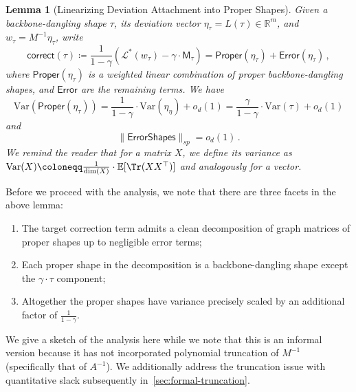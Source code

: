 \documentclass[12pt]{article}
\def \R {\mathbb{R}}
\def \E {\mathbb{E}}
\newcommand{\Var}{\mathrm{Var}}
\newtheorem{lemma}[theorem]{Lemma}
\newcommand{\gam}{\gamma}
\newcommand{\cm}{\mathsf{M} }
\newcommand{\corr}{\mathsf{correct}}
\begin{document}
%
% 
 
 \begin{lemma}[Linearizing Deviation Attachment into Proper Shapes]  \label{lem:vertical-concatenation}
 Given a backbone-dangling shape $\tau$, its deviation vector $\eta_\tau = L(\tau) \in \R^m $, and $w_\tau = M^{-1} \eta_\tau$, write \[ 
\corr(\tau) \coloneqq \frac{1}{1-\gamma} \left( \mathcal{L}^*(w_\tau ) - \gam \cdot \cm_\tau  \right)=   \mathsf{Proper}(\eta_\tau) + \mathsf{Error}(\eta_\tau)\,,
 \]
 where $\mathsf{Proper}(\eta_\tau)$ is a weighted linear combination of proper backbone-dangling shapes,	
 and $\mathsf{Error}$ are the remaining terms. We have
 \[ 
 \Var( \mathsf{Proper}(\eta_\tau))  = \frac{1}{1-\gam}\cdot \Var(\eta_\eta)+o_d(1)=  \frac{\gamma}{1-\gam}\cdot \Var(\tau) + o_d(1) 
 \]
 and
  \[
 \|\mathsf{ErrorShapes}\|_{sp} = o_d(1)\,.
  \]
We remind the reader that for a matrix $X$, we define its variance as $\Var(X)\coloneqq \frac{1}{\dim(X)} \cdot \E[\Tr(XX^\top)] $ and analogously for a vector.
  \end{lemma}
  
  Before we proceed with the analysis, we note that there are three facets in the above lemma:\begin{enumerate}
  	\item The target correction term admits a clean decomposition of graph matrices of proper shapes up to negligible error terms;
  	\item Each proper shape in the decomposition is a backbone-dangling shape except the $\gam \cdot \tau$ component;
  	\item  Altogether the proper shapes have variance precisely scaled by an additional factor of $\frac{1}{1-\gamma}$.
  \end{enumerate}  
 We give a sketch of the analysis here while we note that this is an informal version because it has not incorporated polynomial truncation of $M^{-1}$ (specifically that of $A^{-1}$). We additionally address the truncation issue with quantitative slack subsequently in~\cref{sec:formal-truncation}.
\end{document}
